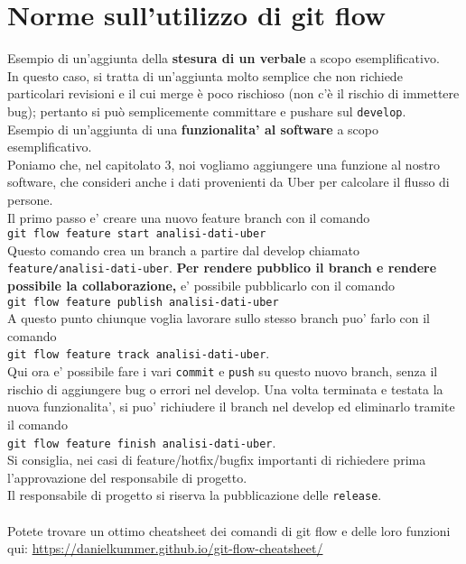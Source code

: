 \chapter{Norme sull'utilizzo di git flow}
Esempio di un'aggiunta della \textbf{stesura di un verbale} a scopo esemplificativo. \\
In questo caso, si tratta di un'aggiunta molto semplice che non richiede particolari revisioni e il cui merge è poco rischioso (non c'è il rischio di immettere bug); pertanto si può semplicemente committare e pushare sul \texttt{develop}.
\\
Esempio di un'aggiunta di una \textbf{funzionalita' al software} a scopo esemplificativo.\\
Poniamo che, nel capitolato 3, noi vogliamo aggiungere una funzione al nostro software, che consideri anche i dati provenienti da Uber per calcolare il flusso di persone.\\
Il primo passo e' creare una nuovo feature branch con il comando \\
\texttt{git flow feature start analisi-dati-uber}\\
Questo comando crea un branch a partire dal develop chiamato \texttt{feature/analisi-dati-uber}.
\textbf{Per rendere pubblico il branch e rendere possibile la collaborazione,} e' possibile pubblicarlo con il comando \\
\texttt{git flow feature publish analisi-dati-uber}\\
A questo punto chiunque voglia lavorare sullo stesso branch puo' farlo con il comando \\
\texttt{git flow feature track analisi-dati-uber}.\\
Qui ora e' possibile fare i vari \texttt{commit} e \texttt{push} su questo nuovo branch, senza il rischio di aggiungere bug o errori nel develop.
Una volta terminata e testata la nuova funzionalita', si puo' richiudere il branch nel develop ed eliminarlo tramite il comando \\
\texttt{git flow feature finish analisi-dati-uber}.\\
Si consiglia, nei casi di feature/hotfix/bugfix importanti di richiedere prima l'approvazione del responsabile di progetto.\\
Il responsabile di progetto si riserva la pubblicazione delle \texttt{release}.\\
\\
Potete trovare un ottimo cheatsheet dei comandi di git flow e delle loro funzioni qui:
\url{https://danielkummer.github.io/git-flow-cheatsheet/}\\
